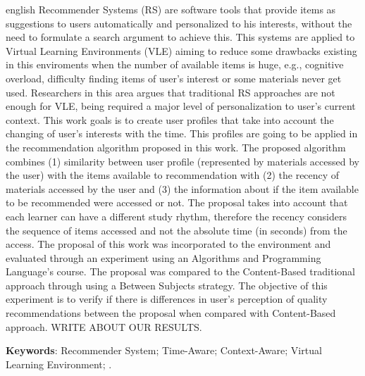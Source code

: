 \begin{resumo}[Abstract]
 \begin{otherlanguage*}{english}
  	Recommender Systems (RS) are software tools that provide items as suggestions to users automatically and personalized to his
    interests, without the need to formulate a search argument to achieve this. This systems are applied to Virtual Learning
    Environments (VLE) aiming to reduce some drawbacks existing in this enviroments when the number of available items is
    huge, e.g., cognitive overload, difficulty finding items of user's interest or some materials never get used. Researchers
    in this area argues that traditional RS approaches are not enough for VLE, being required a major level of personalization
    to user's current context. This work goals is to create user profiles that take into account the changing of user's interests
    with the time. This profiles are going to be applied in the recommendation algorithm proposed in this work. The proposed
    algorithm combines (1) similarity between user profile (represented by materials accessed by the user) with the items
    available to recommendation with (2) the recency of materials accessed by the user and (3) the information about if
    the item available to be recommended were accessed or not. The proposal takes into account that each learner can have
    a different study rhythm, therefore the recency considers the sequence of items accessed and not the absolute time (in
    seconds) from the access. The proposal of this work was incorporated to the \adaptweb environment and evaluated
    through an experiment using an Algorithms and Programming Language's course. The proposal was compared to the Content-Based traditional approach
    through using a Between Subjects strategy. The objective of this experiment is to verify if there is differences
    in user's perception of quality recommendations between the proposal when compared with Content-Based approach.
    WRITE ABOUT OUR RESULTS.
    \vspace{\onelineskip}

    \noindent
    \textbf{Keywords}: Recommender System; Time-Aware; Context-Aware; Virtual Learning Environment; \adaptweb.
 \end{otherlanguage*}
\end{resumo}

\listoffigures*
\cleardoublepage

\listoftables*
\cleardoublepage